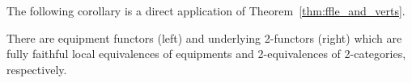 \documentclass[12pt,oneside,article,draft]{memoir}
\begin{document}
The following corollary is a direct application of Theorem~\ref{thm:ffle_and_verts}.

\begin{corollary}\label{cor:TrCat_ObjectFree}
There are equipment functors (left) and underlying 2-functors (right)
\centerThis{
   \parbox{2in}{
      \begin{align*}
         \dObFrMonProf&\to\dMonProf\\
         \dObFrTrProf&\to\dTrProf\\
         \dObFrCompProf&\to\dCompProf
      \end{align*}
   }
   \hspace{.5in}
   \parbox{2.4in}{
      \begin{align*}
         \VVer(\dObFrMonProf)&\to\MMonCat\\
         \VVer(\dObFrTrProf)&\to\TTrCat\\
         \VVer(\dObFrCompProf)&\to\CCompCat
      \end{align*}
   }
} 
which are fully faithful local equivalences of equipments and 2-equivalences of 2-categories, respectively.
\end{corollary}
\end{document}
